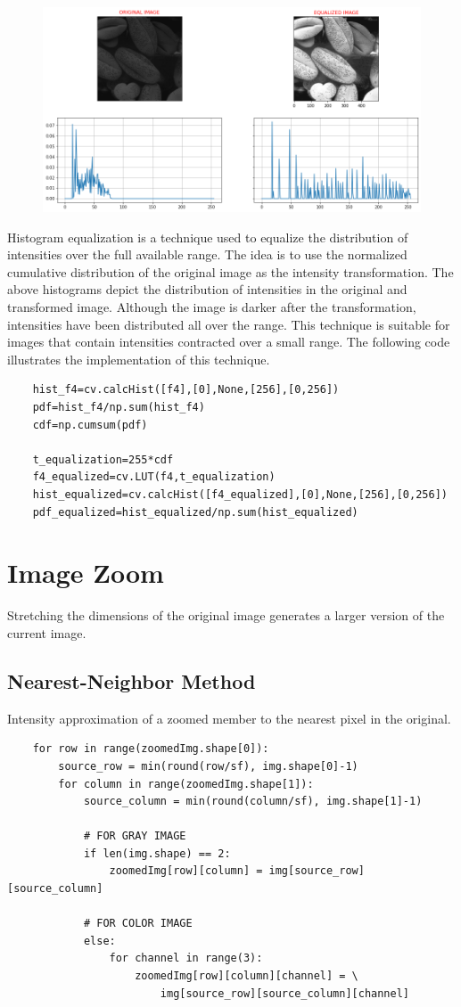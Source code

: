 \documentclass[12pt,a4paper]{article}
\begin{document}
\begin{figure}[h]
    \includegraphics[width=\textwidth]{q4.png}
    \centering
\end{figure}
Histogram equalization is a technique used to equalize the distribution of intensities over the full available range. The idea is to use the normalized cumulative distribution of the original image as the intensity transformation. The above histograms depict the distribution of intensities in the original and transformed image. Although the image is darker after the transformation, intensities have been distributed all over the range. This technique is suitable for images that contain intensities contracted over a small range. The following code illustrates the implementation of this technique.
\newpage
\begin{lstlisting}
    hist_f4=cv.calcHist([f4],[0],None,[256],[0,256])
    pdf=hist_f4/np.sum(hist_f4)
    cdf=np.cumsum(pdf)
    
    t_equalization=255*cdf
    f4_equalized=cv.LUT(f4,t_equalization)
    hist_equalized=cv.calcHist([f4_equalized],[0],None,[256],[0,256])
    pdf_equalized=hist_equalized/np.sum(hist_equalized)
\end{lstlisting}

\section{Image Zoom}
Stretching the dimensions of the original image generates a larger version of the current image.
\subsection{Nearest-Neighbor Method}
Intensity approximation of a zoomed member to the nearest pixel in the original.
\begin{lstlisting}
    for row in range(zoomedImg.shape[0]):
        source_row = min(round(row/sf), img.shape[0]-1)
        for column in range(zoomedImg.shape[1]):
            source_column = min(round(column/sf), img.shape[1]-1)

            # FOR GRAY IMAGE
            if len(img.shape) == 2:
                zoomedImg[row][column] = img[source_row][source_column]
            
            # FOR COLOR IMAGE
            else:
                for channel in range(3):
                    zoomedImg[row][column][channel] = \
                        img[source_row][source_column][channel]
\end{lstlisting}
\end{document}
